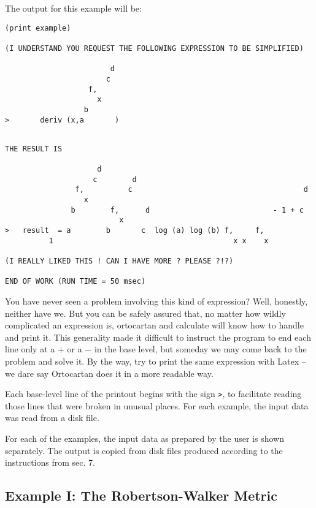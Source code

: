 \bigskip

\noindent The output for this example will be:

\bigskip

{\samepage
\begin{verbatim}
(print example)

(I UNDERSTAND YOU REQUEST THE FOLLOWING EXPRESSION TO BE SIMPLIFIED)

                        d
                       c
                   f,
                     x
                  b
>       deriv (x,a       )
\end{verbatim} }
\begin{verbatim}

THE RESULT IS

                     d
                    c        d
                f,          c                                       d
                  x
               b        f,      d                            - 1 + c
                          x
>   result  = a        b       c  log (a) log (b) f,     f,
          1                                         x x    x

(I REALLY LIKED THIS ! CAN I HAVE MORE ? PLEASE ?!?)

END OF WORK (RUN TIME = 50 msec)
\end{verbatim}

\bigskip

\noindent You have  never  seen  a  problem  involving  this  kind  of
     expression? Well, honestly, neither have we. But you can  be
     safely assured that, no matter  how  wildly  complicated  an
     expression is, ortocartan and calculate  will  know  how  to
     handle and print it. This generality made  it  difficult  to
     instruct the program to end each line only at a $+$ or a $-$  in
     the base level, but someday we may come back to the  problem
and solve it. By the way, try to print the same expression with Latex -- we
dare say Ortocartan does it in a more readable way.

Each base-level line of the printout begins with the sign \verb+>+, to
facilitate  reading  those  lines
     that were broken in unusual places. For  each  example,  the
     input data was read from a disk file.

For each of the examples, the input data as prepared by
     the user is shown separately. The output is copied from disk
     files produced according to the instructions  from  sec. 7.

\subsection{Example I: The Robertson-Walker Metric}

